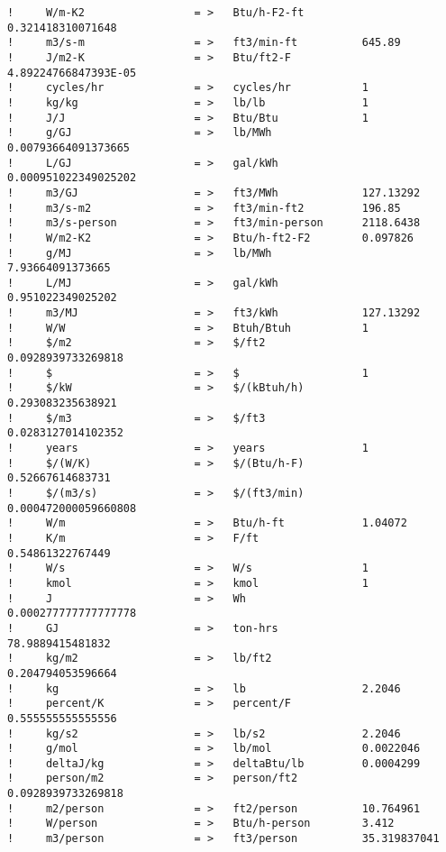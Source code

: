 \begin{lstlisting}
!     W/m-K2                 = >   Btu/h-F2-ft         0.321418310071648
!     m3/s-m                 = >   ft3/min-ft          645.89
!     J/m2-K                 = >   Btu/ft2-F           4.89224766847393E-05
!     cycles/hr              = >   cycles/hr           1
!     kg/kg                  = >   lb/lb               1
!     J/J                    = >   Btu/Btu             1
!     g/GJ                   = >   lb/MWh              0.00793664091373665
!     L/GJ                   = >   gal/kWh             0.000951022349025202
!     m3/GJ                  = >   ft3/MWh             127.13292
!     m3/s-m2                = >   ft3/min-ft2         196.85
!     m3/s-person            = >   ft3/min-person      2118.6438
!     W/m2-K2                = >   Btu/h-ft2-F2        0.097826
!     g/MJ                   = >   lb/MWh              7.93664091373665
!     L/MJ                   = >   gal/kWh             0.951022349025202
!     m3/MJ                  = >   ft3/kWh             127.13292
!     W/W                    = >   Btuh/Btuh           1
!     $/m2                   = >   $/ft2               0.0928939733269818
!     $                      = >   $                   1
!     $/kW                   = >   $/(kBtuh/h)         0.293083235638921
!     $/m3                   = >   $/ft3               0.0283127014102352
!     years                  = >   years               1
!     $/(W/K)                = >   $/(Btu/h-F)         0.52667614683731
!     $/(m3/s)               = >   $/(ft3/min)         0.000472000059660808
!     W/m                    = >   Btu/h-ft            1.04072
!     K/m                    = >   F/ft                0.54861322767449
!     W/s                    = >   W/s                 1
!     kmol                   = >   kmol                1
!     J                      = >   Wh                  0.000277777777777778
!     GJ                     = >   ton-hrs             78.9889415481832
!     kg/m2                  = >   lb/ft2              0.204794053596664
!     kg                     = >   lb                  2.2046
!     percent/K              = >   percent/F           0.555555555555556
!     kg/s2                  = >   lb/s2               2.2046
!     g/mol                  = >   lb/mol              0.0022046
!     deltaJ/kg              = >   deltaBtu/lb         0.0004299
!     person/m2              = >   person/ft2          0.0928939733269818
!     m2/person              = >   ft2/person          10.764961
!     W/person               = >   Btu/h-person        3.412
!     m3/person              = >   ft3/person          35.319837041

\end{lstlisting}
